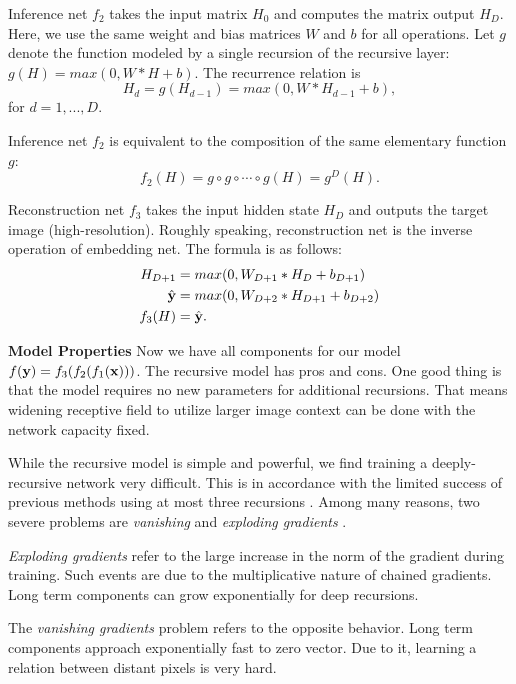\documentclass[10pt,twocolumn,letterpaper]{article}
\begin{document}
Inference net $f_2$ takes the input matrix $H_0$ and computes the matrix output $H_{D}$. Here, we use the same weight and bias matrices $W$ and $b$ for all operations.  Let $g$ denote the function modeled by a single recursion of the recursive layer: $g(H)=max(0,W*H+b)$. The recurrence relation is  
\begin{equation}
 H_d = g(H_{d-1}) = max(0,W*H_{d-1}+b),
\end{equation}
for $d = 1, ..., D$. 

Inference net $f_2$ is equivalent to the composition of the same elementary function $g$: 
\begin{equation}
f_2(H) = g \circ g \circ \cdots \circ g(H) =  g^{D}(H).
\end{equation}

Reconstruction net $f_3$ takes the input hidden state $H_D$ and outputs the target image (high-resolution). Roughly speaking, reconstruction net is the inverse operation of embedding net. The formula is as follows:
\begin{align}
	H_{D+1} &= max(0, W_{D+1}*H_D + b_{D+1})\\
	\hat{{\bf y}} &= max(0, W_{D+2}*H_{D+1} + b_{D+2})\\
	f_3(H) &= \hat{{\bf y}}.
\end{align}

\textbf{Model Properties} Now we have all components for our model $f({\bf y}) = f_3(f_2 (f_1({\bf x})))$. The recursive model has pros and cons. One good thing is that the model requires no new parameters for additional recursions. That means widening receptive field to utilize larger image context can be done with the network capacity fixed. 

While the recursive model is simple and powerful, we find training a deeply-recursive network very difficult. This is in accordance with the limited success of previous methods using at most three recursions \cite{Liang_2015_CVPR}.  Among many reasons, two severe problems are \textit{vanishing} and \textit{exploding gradients} \cite{bengio1994learning, pascanu2013difficulty}.  

\textit{Exploding gradients} refer to the large increase in the norm
of the gradient during training. Such events are due to
the multiplicative nature of chained gradients. Long term components can grow exponentially for deep recursions.


The
\textit{vanishing gradients} problem refers to the opposite behavior. Long term components approach exponentially
fast to zero vector. Due to it, learning a relation between distant pixels is very hard.
\end{document}
